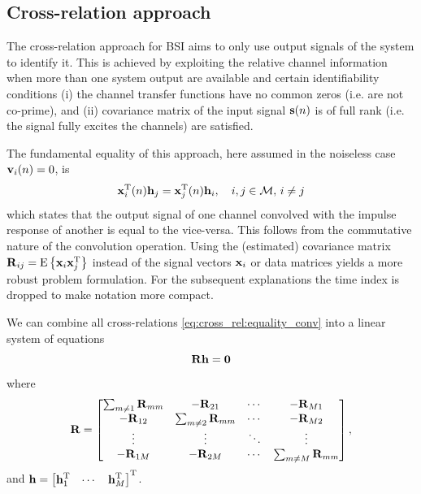 \documentclass{article}
\newcommand{\h}{\mtxb{h}}
\newcommand{\x}{\mtxb{x}}
\newcommand{\R}{\mtxb{R}}
\newcommand{\Mset}{\mathcal{M}}
\begin{document}
\subsection{Cross-relation approach}
\label{ssec:cross_rel}
The cross-relation approach for BSI aims to only use output signals of the system to identify it.
This is achieved by exploiting the relative channel information when more than one system output are available and certain identifiability conditions \cite{} (i) the channel transfer functions have no common zeros (i.e. are not co-prime), and (ii) covariance matrix of the input signal \(\bm{\mathrm{s}}(n)\) is of full rank (i.e. the signal fully excites the channels) are satisfied.

The fundamental equality of this approach, here assumed in the noiseless case \(\bm{\mathrm{v}}_i(n) = 0\), is 
\begin{equation}
    \x_i^{\T}(n) \h_j = \x_j^{\T}(n) \h_i,\quad i,j \in \Mset,\,i\neq j\label{eq:cross_rel:equality_conv}
\end{equation}
which states that the output signal of one channel convolved with the impulse response of another is equal to the vice-versa.
This follows from the commutative nature of the convolution operation.
Using the (estimated) covariance matrix \(\R_{ij} = \ev{\x_i \x_j^\T}\) instead of the signal vectors \(\x_i\) or data matrices yields a more robust problem formulation.
For the subsequent explanations the time index is dropped to make notation more compact.

We can combine all cross-relations \eqref{eq:cross_rel:equality_conv} into a linear system of equations
\begin{equation}
    \R \h = \bm{0} \label{eq:cross_rel:null_space}\\
\end{equation}
where 
\begin{equation}
    \R = \begin{bmatrix}
        \sum_{m \neq 1} \R_{mm} & -\R_{21} & \cdots & -\R_{M1}\\
        -\R_{12} & \sum_{m \neq 2} \R_{mm} & \cdots & -\R_{M2}\\
        \vdots & \vdots & \ddots & \vdots\\
        -\R_{1M} & -\R_{2M} & \cdots & \sum_{m \neq M} \R_{mm}\\
    \end{bmatrix},\label{eq:cross_rel:data_matrix}
\end{equation}
and \(\h = \begin{bmatrix}
    \h_1^\T & \cdots & \h_M^\T
\end{bmatrix}^\T\).
\end{document}
